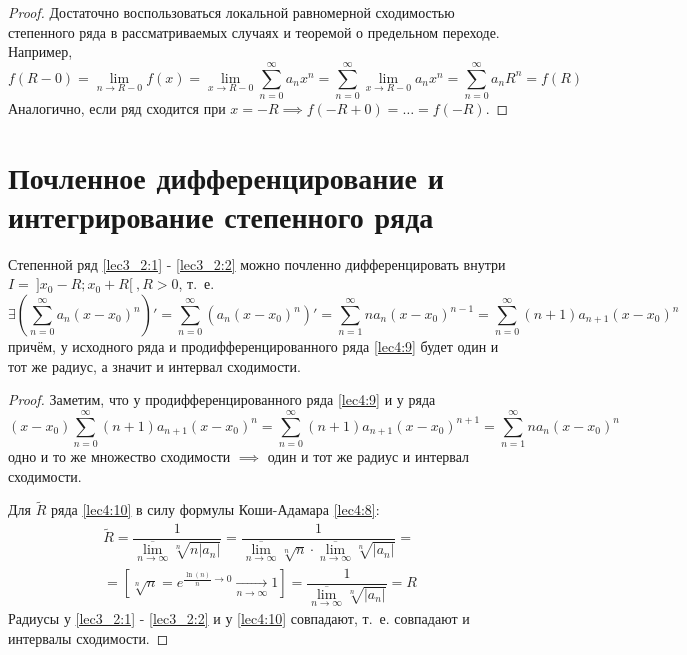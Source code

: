 \documentclass[../../main.tex]{subfiles}
\begin{document}
\begin{proof}
	Достаточно воспользоваться локальной равномерной сходимостью
	степенного ряда в рассматриваемых случаях и 
	теоремой о предельном переходе. Например,
	\[ f(R - 0) = \underset{n \to R - 0}{\lim} f(x) = 
	\underset{x \to R - 0}{\lim} \sum\limits_{n = 0}^{\infty} a_n x^n =
	\sum\limits_{n = 0}^{\infty} \underset{x \to R - 0}{\lim} a_n x^n = 
	\sum\limits_{n = 0}^{\infty} a_n R^n = f(R)
	\]
	Аналогично, если ряд сходится при $x = -R \implies f(-R + 0) = 
	\ldots = f(-R)$.
\end{proof}

\section{Почленное дифференцирование и интегрирование степенного ряда}

\begin{thm}
	Степенной ряд \eqref{lec3_2:1} - \eqref{lec3_2:2} можно почленно 
	дифференцировать внутри $I = \: ]x_0 - R; x_0 + R[ \:, R > 0$, т.~е.
	\begin{equation} \label{lec4:9}
		\exists \left( \sum\limits_{n = 0}^{\infty} a_n(x - x_0)^n \right)' = 
		\sum\limits_{n = 0}^{\infty} \left( a_n(x - x_0)^n \right)' = 
		\sum\limits_{n = 1}^{\infty} n a_n(x - x_0)^{n - 1} = 
		\sum\limits_{n = 0}^{\infty} (n + 1)a_{n + 1} (x - x_0)^n
	\end{equation} 
	причём, у исходного ряда и продифференцированного ряда 
	\eqref{lec4:9} будет один и тот же радиус, а значит и интервал сходимости.
\end{thm}

\begin{proof}
	Заметим, что у продифференцированного ряда \eqref{lec4:9} и у ряда \\
	\begin{equation} \label{lec4:10}
		(x - x_0) \sum\limits_{n = 0}^{\infty} (n + 1)a_{n + 1}(x - x_0)^n = 
		\sum\limits_{n = 0}^{\infty} (n + 1) a_{n + 1} (x - x_0)^{n + 1} = 
		\sum\limits_{n = 1}^{\infty} n a_n (x - x_0)^n
	\end{equation}
	одно и то же множество сходимости $\implies $ один и тот же 
	радиус и интервал сходимости.
	
	Для $\widetilde{R}$ ряда \eqref{lec4:10} в силу 
	формулы Коши-Адамара \eqref{lec4:8}: 
	\[ \begin{gathered}
	\widetilde{R} = \dfrac{1}{  \underset{n \to \infty}{\overline{\lim}}
	\sqrt[n]{n|a_n|}  } = 
	\dfrac{1}{  \underset{n \to \infty}{\overline{\lim}} \sqrt[n]{n}
	\cdot \underset{n \to \infty}{\overline{\lim}} \sqrt[n]{|a_n|}  } = \\
	= \left[ \sqrt[n]{n} = e^{ \frac{\ln(n)}{n} \rightarrow 0 } 
	\underset{n \to \infty}{\longrightarrow} 1 \right] = 
	\dfrac{1}{  \underset{n \to \infty}{\overline{\lim}} \sqrt[n]{|a_n|} } = R
	\end{gathered} \]
	Радиусы у \eqref{lec3_2:1} - \eqref{lec3_2:2}
	и у \eqref{lec4:10} совпадают, т.~е.
	совпадают и интервалы сходимости.
\end{proof}
\end{document}
